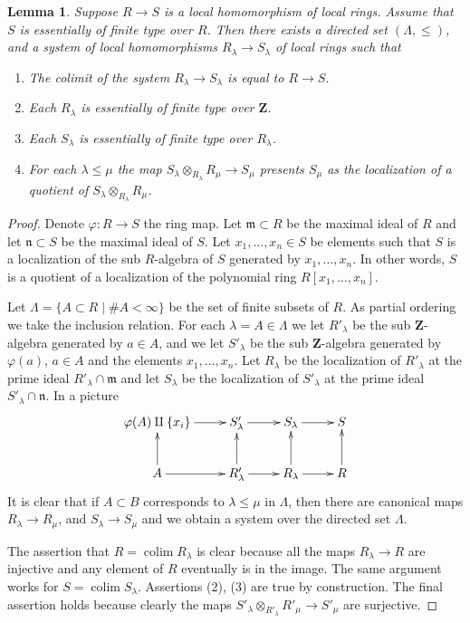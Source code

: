 \documentclass[10pt,a4paper]{amsart}
\theoremstyle{plain}
\newtheorem{lemma}[subsection]{Lemma}
\theoremstyle{definition}
\theoremstyle{remark}
\numberwithin{equation}{subsection}
\def\colim{\mathop{\mathrm{colim}}\nolimits}
\begin{document}
\begin{lemma}
\label{lemma-limit-essentially-finite-type}
Suppose $R \to S$ is a local homomorphism of local rings.
Assume that $S$ is essentially of finite type over $R$.
Then there exists a directed set $(\Lambda, \leq)$, and
a system of local homomorphisms $R_\lambda \to S_\lambda$
of local rings such that
\begin{enumerate}
\item The colimit of the system $R_\lambda \to S_\lambda$
is equal to $R \to S$.
\item Each $R_\lambda$ is essentially of finite type
over $\mathbf{Z}$.
\item Each $S_\lambda$ is essentially of finite type
over $R_\lambda$.
\item For each $\lambda \leq \mu$ the map
$S_\lambda \otimes_{R_\lambda} R_\mu \to S_\mu$
presents $S_\mu$ as the localization of a quotient
of $S_\lambda \otimes_{R_\lambda} R_\mu$.
\end{enumerate}
\end{lemma}

\begin{proof}
Denote $\varphi : R  \to S$ the ring map.
Let $\mathfrak m \subset R$ be the maximal ideal
of $R$ and let $\mathfrak n \subset S$ be the maximal
ideal of $S$. Let $x_1, \ldots, x_n \in S$ be elements such that
$S$ is a localization of the sub $R$-algebra of $S$
generated by $x_1, \ldots, x_n$. In other words, $S$
is a quotient of a localization of the polynomial ring
$R[x_1, \ldots, x_n]$.

\medskip\noindent
Let $\Lambda = \{ A \subset R \mid \# A < \infty\}$
be the set of finite subsets of $R$.
As partial ordering we take the inclusion relation. For each
$\lambda = A \in \Lambda$ we let $R'_\lambda$ be
the sub $\mathbf{Z}$-algebra generated by
$a \in A$, and we let $S'_\lambda$ be the sub
$\mathbf{Z}$-algebra generated by $\varphi(a)$, $a \in A$
and the elements $x_1, \ldots, x_n$. Let $R_\lambda$ be
the localization of $R'_\lambda$ at the prime ideal
$R'_\lambda \cap \mathfrak m$ and let
$S_\lambda$ be the localization of $S'_\lambda$ at
the prime ideal $S'_\lambda \cap \mathfrak n$.
In a picture
$$
\xymatrix{
\varphi(A) \amalg \{x_i\} \ar[r] &
S'_\lambda \ar[r] &
S_\lambda \ar[r] &
S \\
A \ar[r] \ar[u] &
R'_\lambda \ar[r] \ar[u] &
R_\lambda \ar[r] \ar[u] &
R \ar[u]
}
$$
It is clear that if $A \subset B$ corresponds to
$\lambda \leq \mu$ in $\Lambda$, then there are
canonical maps $R_\lambda \to R_\mu$, and $S_\lambda \to S_\mu$
and we obtain a system over the directed set $\Lambda$.

\medskip\noindent
The assertion that $R = \colim R_\lambda$ is clear
because all the maps $R_\lambda \to R$ are injective and
any element of $R$ eventually is in the image. The same
argument works for $S = \colim S_\lambda$.
Assertions (2), (3) are true by construction.
The final assertion holds because clearly
the maps $S'_\lambda \otimes_{R'_\lambda} R'_\mu
\to S'_\mu$ are surjective.
\end{proof}
\end{document}
